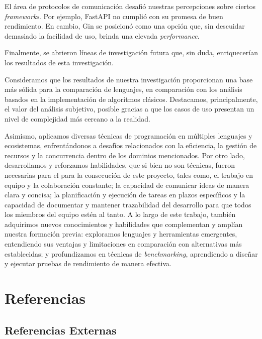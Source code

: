 \documentclass[11pt]{article}
\let\Oldsection\section
\renewcommand{\section}{\FloatBarrier\Oldsection}
\let\Oldsubsection\subsection
\renewcommand{\subsection}{\FloatBarrier\Oldsubsection}
\newcommand{\english}[1]{\textit{#1}}
\begin{document}
El área de protocolos de comunicación desafió nuestras percepciones sobre ciertos \textit{frameworks}. Por ejemplo, FastAPI no cumplió con su promesa de buen rendimiento. En cambio, Gin se posicionó como una opción que, sin descuidar demasiado la facilidad de uso, brinda una elevada \english{performance}.

Finalmente, se abrieron líneas de investigación futura que, sin duda, enriquecerían los resultados de esta investigación.

Consideramos que los resultados de nuestra investigación proporcionan una base más sólida para la comparación de lenguajes, en comparación con los análisis basados en la implementación de algoritmos clásicos. Destacamos, principalmente, el valor del análisis subjetivo, posible gracias a que los casos de uso presentan un nivel de complejidad más cercano a la realidad.

Asimismo, aplicamos diversas técnicas de programación en múltiples lenguajes y ecosistemas, enfrentándonos a desafíos relacionados con la eficiencia, la gestión de recursos y la concurrencia dentro de los dominios mencionados. Por otro lado, desarrollamos y reforzamos habilidades, que si bien no son técnicas, fueron necesarias para el para la consecución de este proyecto, tales como, el trabajo en equipo y la colaboración constante; la capacidad de comunicar ideas de manera clara y concisa; la planificación y ejecución de tareas en plazos específicos y la capacidad de documentar y mantener trazabilidad del desarrollo para que todos los miembros del equipo estén al tanto. A lo largo de este trabajo, también adquirimos nuevos conocimientos y habilidades que complementan y amplían nuestra formación previa: exploramos lenguajes y herramientas emergentes, entendiendo sus ventajas y limitaciones en comparación con alternativas más establecidas; y profundizamos en técnicas de \english{benchmarking}, aprendiendo a diseñar y ejecutar pruebas de rendimiento de manera efectiva.

\newpage

\section{Referencias}

\subsection{Referencias Externas}

\begingroup
\raggedright
\printbibliography[notkeyword={repos},heading=none] %
\endgroup
\end{document}
